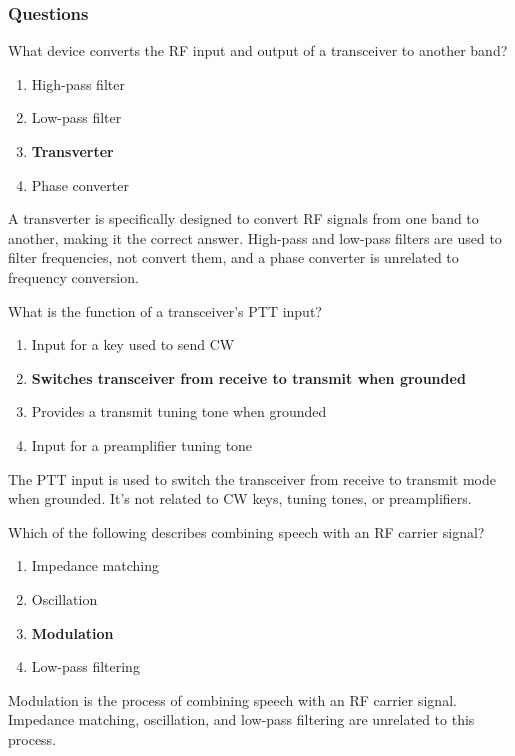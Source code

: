 \subsubsection*{Questions}
\begin{tcolorbox}[colback=gray!10!white,colframe=black!75!black,title={T7A06}]
    What device converts the RF input and output of a transceiver to another band?
    \begin{enumerate}[label=\Alph*),noitemsep]
        \item High-pass filter
        \item Low-pass filter
        \item \textbf{Transverter}
        \item Phase converter
    \end{enumerate}
\end{tcolorbox}
A transverter is specifically designed to convert RF signals from one band to another, making it the correct answer. High-pass and low-pass filters are used to filter frequencies, not convert them, and a phase converter is unrelated to frequency conversion.

\begin{tcolorbox}[colback=gray!10!white,colframe=black!75!black,title={T7A07}]
    What is the function of a transceiver’s PTT input?
    \begin{enumerate}[label=\Alph*),noitemsep]
        \item Input for a key used to send CW
        \item \textbf{Switches transceiver from receive to transmit when grounded}
        \item Provides a transmit tuning tone when grounded
        \item Input for a preamplifier tuning tone
    \end{enumerate}
\end{tcolorbox}
The PTT input is used to switch the transceiver from receive to transmit mode when grounded. It’s not related to CW keys, tuning tones, or preamplifiers.

\begin{tcolorbox}[colback=gray!10!white,colframe=black!75!black,title={T7A08}]
    Which of the following describes combining speech with an RF carrier signal?
    \begin{enumerate}[label=\Alph*),noitemsep]
        \item Impedance matching
        \item Oscillation
        \item \textbf{Modulation}
        \item Low-pass filtering
    \end{enumerate}
\end{tcolorbox}
Modulation is the process of combining speech with an RF carrier signal. Impedance matching, oscillation, and low-pass filtering are unrelated to this process.

